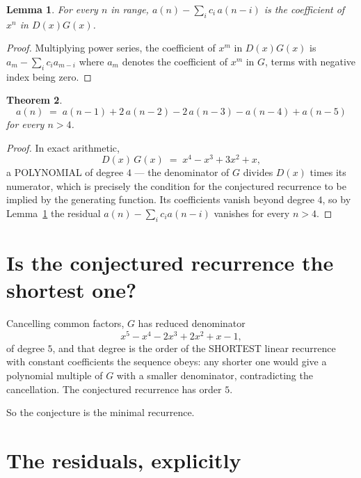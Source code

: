 \documentclass[11pt,a4paper]{article}
\theoremstyle{plain}
\newtheorem{theorem}{Theorem}
\newtheorem{lemma}[theorem]{Lemma}
\theoremstyle{definition}
\begin{document}
\begin{lemma}\label{lem:key}
For every $n$ in range, $a(n)-\sum_i c_i\,a(n-i)$ is the coefficient of $x^{n}$ in
$D(x)G(x)$.
\end{lemma}

\begin{proof}
Multiplying power series, the coefficient of $x^{m}$ in $D(x)G(x)$ is
$a_m-\sum_i c_i a_{m-i}$ where $a_m$ denotes the coefficient of $x^{m}$ in $G$, terms with
negative index being zero.
\end{proof}

\begin{theorem}
\[
a(n)\;=\;a(n-1) + 2\,a(n-2) - 2\,a(n-3) - a(n-4) + a(n-5)
\]
for every $n>4$.
\end{theorem}

\begin{proof}
In exact arithmetic,
\[
D(x)\,G(x)\;=\;x^{4} - x^{3} + 3 x^{2} + x,
\]
a POLYNOMIAL of degree $4$ --- the denominator of $G$ divides $D(x)$ times its numerator,
which is precisely the condition for the conjectured recurrence to be implied by the
generating function. Its coefficients vanish beyond degree $4$, so by
Lemma~\ref{lem:key} the residual $a(n)-\sum_ic_ia(n-i)$ vanishes for every
$n>4$.
\end{proof}

\section{Is the conjectured recurrence the shortest one?}

Cancelling common factors, $G$ has reduced denominator
\[
x^{5} - x^{4} - 2 x^{3} + 2 x^{2} + x - 1,
\]
of degree $5$, and that degree is the order of the SHORTEST linear recurrence with
constant coefficients the sequence obeys: any shorter one would give a polynomial multiple of
$G$ with a smaller denominator, contradicting the cancellation. The conjectured recurrence has
order $5$.

So the conjecture is the minimal recurrence.

\section{The residuals, explicitly}
\end{document}
